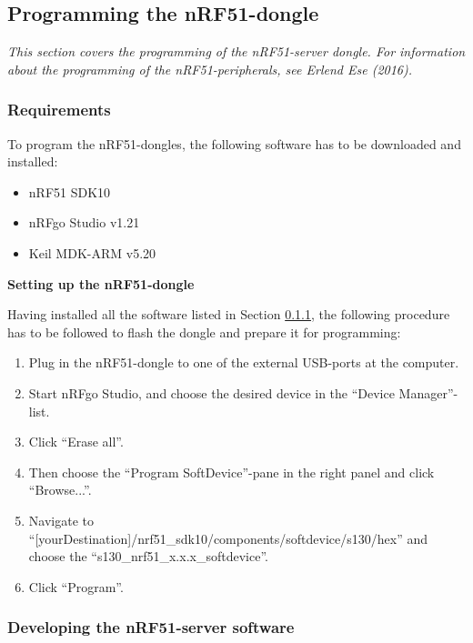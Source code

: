 \subsection{Programming the nRF51-dongle}
\textit{This section covers the programming of the nRF51-server dongle. For information about the programming of the nRF51-peripherals, see Erlend Ese (2016).}

\subsubsection{Requirements}
\label{sec:nrfrequirements}
To program the nRF51-dongles, the following software has to be downloaded and installed:
\begin{itemize}
	\item nRF51 SDK10\cite{nrf51sdk}
	\item nRFgo Studio v1.21\cite{nrfgo}
	\item Keil MDK-ARM v5.20\cite{keil}
\end{itemize}

\textbf{Setting up the nRF51-dongle}

Having installed all the software listed in Section \ref{sec:nrfrequirements}, the following procedure has to be followed to flash the dongle and prepare it for programming:
\begin{enumerate}
	\item Plug in the nRF51-dongle to one of the external USB-ports at the computer.
	\item Start nRFgo Studio, and choose the desired device in the ``Device Manager''-list.
	\item Click ``Erase all''.
	\item Then choose the ``Program SoftDevice''-pane in the right panel and click ``Browse...''.
	\item Navigate to ``[yourDestination]/nrf51\_sdk10/components/softdevice/s130/hex'' and choose the ``s130\_nrf51\_x.x.x\_softdevice''.
	\item Click ``Program''.
\end{enumerate}

\subsubsection{Developing the nRF51-server software}
